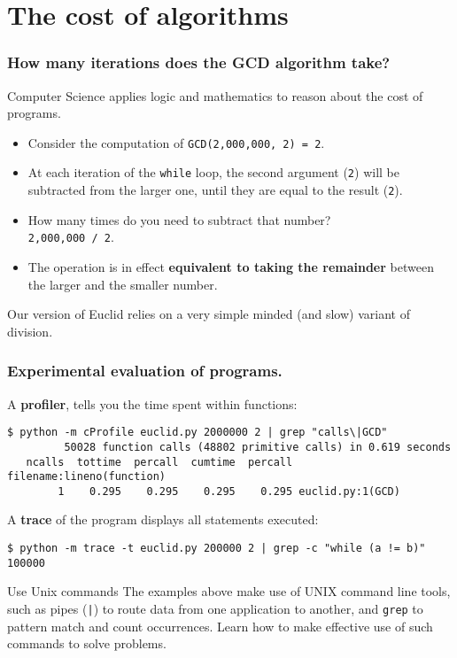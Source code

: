\documentclass{beamer} %
\newcommand\emc[1]{\textcolor{brightblue}{\textbf{#1}}}
\begin{document}
\section{The cost of algorithms}

\begin{frame}
\frametitle{How many iterations does the GCD algorithm take?}

Computer Science applies logic and mathematics to reason about the cost of programs.
\begin{itemize}
	\item Consider the computation of \texttt{GCD(2,000,000, 2) = 2}.
	\item At each iteration of the \texttt{while} loop, the second argument (\texttt{2}) will be subtracted from the larger one, until they are equal to the result (\texttt{2}).
	\item How many times do you need to subtract that number? \\ 
	\texttt{2,000,000 / 2}.
	\item The operation is in effect \emc{equivalent to taking the remainder} between the larger and the smaller number. 
\end{itemize}

\vspace{3mm}
Our version of Euclid relies on a very simple minded (and slow) variant of division.

\end{frame}

\begin{frame}[fragile]
\frametitle{Experimental evaluation of programs.}

A \emc{profiler}, tells you the time spent within functions:
\begin{Verbatim}[fontsize=\scriptsize]
$ python -m cProfile euclid.py 2000000 2 | grep "calls\|GCD"
         50028 function calls (48802 primitive calls) in 0.619 seconds
   ncalls  tottime  percall  cumtime  percall filename:lineno(function)
        1    0.295    0.295    0.295    0.295 euclid.py:1(GCD)
\end{Verbatim}

A \emc{trace} of the program displays all statements executed:
\begin{Verbatim}[fontsize=\scriptsize]
$ python -m trace -t euclid.py 200000 2 | grep -c "while (a != b)"
100000
\end{Verbatim}

\begin{block}{Use Unix commands}
The examples above make use of UNIX command line tools, such as pipes (\texttt{|}) to route data from one application to another, and \texttt{grep} to pattern match and count occurrences. Learn how to make effective use of such commands to solve problems.
\end{block}

\end{frame}
\end{document}
